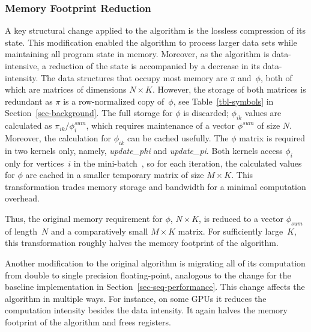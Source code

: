 \subsubsection{Memory Footprint Reduction}

A key structural change applied to the algorithm is the lossless compression of
its state. This modification enabled the algorithm to process larger data sets
while maintaining all program state in memory. Moreover, as the algorithm is
data-intensive, a reduction of the state is accompanied by a decrease in its
data-intensity.
%
The data structures that occupy most memory are $\pi$ and~$\phi$, both of
which are matrices of dimensions ${N}\times{K}$. However, the storage of both
matrices is redundant as $\pi$ is a row-normalized copy of~$\phi$, see
Table~\ref{tbl-symbols} in Section~\ref{sec-background}. The full storage for
$\phi$ is discarded; $\phi_{ik}$ values are calculated as
$\pi_{ik}/\phi^{sum}_i$, which requires maintenance of a vector
$\phi^{sum}$ of size $N$.
Moreover, the calculation for $\phi_{ik}$ can be cached usefully.
%
The $\phi$ matrix is required in two kernels only, namely, \textit{update\_phi} and
\textit{update\_pi}. Both kernels access $\phi_i$ only for vertices~$i$ in the
mini-batch~\Minibatch, so for each iteration, the calculated values for $\phi$ are cached
in a smaller temporary matrix of size
$M\times{K}$.
%
%
This transformation trades memory storage and
bandwidth for a minimal computation overhead.
%

Thus, the original memory requirement for $\phi$, ${N}\times{K}$, is
reduced to a vector $\phi_{sum}$ of length~$N$ and a comparatively small
$M\times{K}$ matrix. For sufficiently large~$K$, this transformation roughly
halves the memory footprint of the algorithm.

Another modification to the original algorithm is migrating all of its
computation from double to single precision floating-point, analogous to the change
for the baseline implementation in Section~\ref{sec-seq-performance}.
%
This change affects the algorithm in multiple ways. For instance, on some GPUs it
reduces
the computation intensity besides the data intensity. It again halves the memory
footprint of the algorithm and frees registers.

